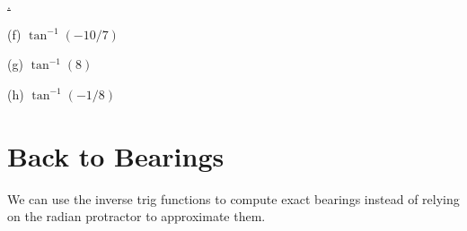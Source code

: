 \documentclass{ximera}
\begin{document}
\begin{question}
\begin{exploration}
{\href{https://www.desmos.com/calculator/zpjfxxl23e}.
}
 
\begin{onlineOnly}
    \begin{center}
\end{center}
\end{onlineOnly}
\end{exploration}

(f) $\tan^{-1}(-10/7)$

(g) $\tan^{-1}(8)$

(h) $\tan^{-1}(-1/8)$



\end{question}


\section{Back to Bearings}
We can use the inverse trig functions to compute exact bearings instead of relying on the radian protractor to approximate them.
\end{document}
